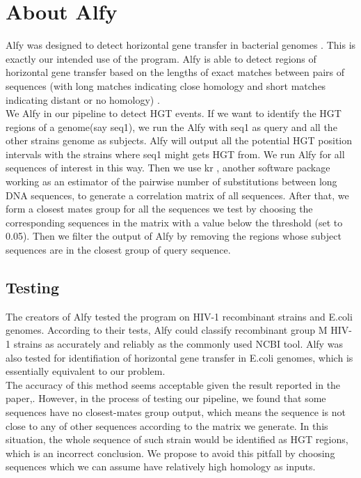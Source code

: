 \documentclass[12pt]{article}
\newcommand{\tab}{\hspace*{3em}}
\begin{document}
\section{About Alfy}
\tab Alfy was designed to detect horizontal gene transfer in bacterial genomes \cite{Alfy}. This is exactly our intended use of the program. Alfy is able to detect regions of horizontal gene transfer based on the lengths of exact matches between pairs of sequences (with long matches indicating close homology and short matches indicating distant or no homology) \cite{Alfy}. \\
\tab We Alfy in our pipeline to detect HGT events. If we want to identify the HGT regions of a genome(say seq1), we run the Alfy with seq1 as query and all the other strains genome as subjects. Alfy will output all the potential HGT position intervals with the strains where seq1 might gets HGT from. We run Alfy for all sequences of interest in this way. Then we use kr \cite{kr}, another software package working as an estimator of the pairwise number of substitutions between long DNA sequences, to generate a correlation matrix of all sequences. After that, we form a closest mates group for all the sequences we test by choosing the corresponding sequences in the matrix with a value below the threshold (set to 0.05). Then we filter the output of Alfy by removing the regions whose subject sequences are in the closest group of query sequence.\\
\subsection{Testing}
\tab The creators of Alfy tested the program on  HIV-1 recombinant strains and E.coli genomes. According to their tests, Alfy could classify recombinant group M HIV-1 strains as accurately and reliably as the commonly used NCBI tool. Alfy was also tested for identifiation of horizontal gene transfer in E.coli genomes, which is essentially equivalent to our problem. \\
\tab The accuracy of this method seems acceptable given the result reported in the paper\cite{Alfy},\cite{kr}. However, in the process of testing our pipeline, we found that some sequences have no closest-mates group output, which means the sequence is not close to any of other sequences according to the matrix we generate. In this situation, the whole sequence of such strain would be identified as HGT regions, which is an incorrect conclusion. We propose to avoid this pitfall by choosing sequences which we can assume have relatively high homology as inputs. \\
\end{document}
